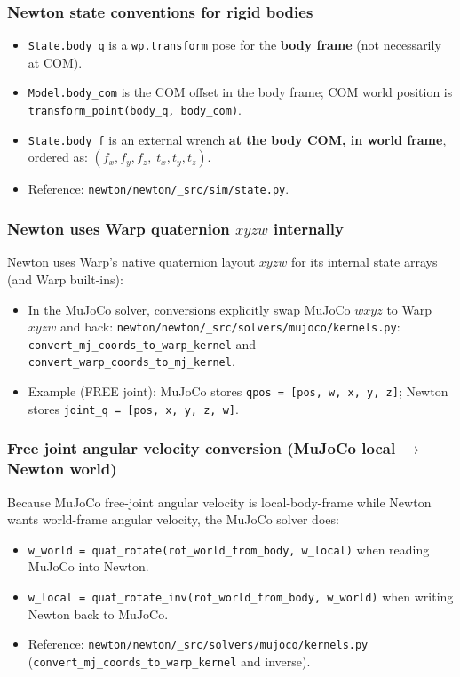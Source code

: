 \subsubsection{Newton state conventions for rigid bodies}
\begin{itemize}
  \item \texttt{State.body\_q} is a \texttt{wp.transform} pose for the \textbf{body frame} (not necessarily at COM).
  \item \texttt{Model.body\_com} is the COM offset in the body frame; COM world position is \texttt{transform\_point(body\_q, body\_com)}.
  \item \texttt{State.body\_f} is an external wrench \textbf{at the body COM, in world frame}, ordered as:
        $(f_x,f_y,f_z,\;t_x,t_y,t_z)$.
  \item Reference: \texttt{newton/newton/\_src/sim/state.py}.
\end{itemize}

\subsubsection{Newton uses Warp quaternion $xyzw$ internally}
Newton uses Warp's native quaternion layout $xyzw$ for its internal state arrays (and Warp built-ins):
\begin{itemize}
  \item In the MuJoCo solver, conversions explicitly swap MuJoCo $wxyz$ to Warp $xyzw$ and back:
        \texttt{newton/newton/\_src/solvers/mujoco/kernels.py}:
        \texttt{convert\_mj\_coords\_to\_warp\_kernel} and \texttt{convert\_warp\_coords\_to\_mj\_kernel}.
  \item Example (FREE joint): MuJoCo stores \texttt{qpos = [pos, w, x, y, z]}; Newton stores \texttt{joint\_q = [pos, x, y, z, w]}.
\end{itemize}

\subsubsection{Free joint angular velocity conversion (MuJoCo local $\rightarrow$ Newton world)}
Because MuJoCo free-joint angular velocity is local-body-frame while Newton wants world-frame angular velocity, the MuJoCo solver does:
\begin{itemize}
  \item \texttt{w\_world = quat\_rotate(rot\_world\_from\_body, w\_local)} when reading MuJoCo into Newton.
  \item \texttt{w\_local = quat\_rotate\_inv(rot\_world\_from\_body, w\_world)} when writing Newton back to MuJoCo.
  \item Reference: \texttt{newton/newton/\_src/solvers/mujoco/kernels.py} (\texttt{convert\_mj\_coords\_to\_warp\_kernel} and inverse).
\end{itemize}


